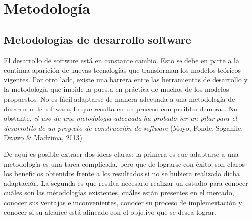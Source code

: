 \section{Metodología}
\subsection{Metodologías de desarrollo software}
El desarrollo de software está en constante cambio. 
Esto se debe en parte a la continua aparición de nuevas tecnologías que 
transforman los modelos teóricos vigentes. Por otro lado, existe una 
barrera entre las herramientas de desarrollo y la metodología que impide 
la puesta en práctica de muchos de los modelos propuestos. No es fácil 
adaptarse de manera adecuada a una metodología de desarrollo de software, 
lo que resulta en un proceso con posibles demoras. No obstante, \textit{el uso de una metodología adecuada ha probado ser un pilar para 
el desarrolllo de un proyecto de construcción de software} (Moyo, Fonde, Soganile, Dzawo \& Madzima, 2013). \medskip



De aquí es posible extraer dos ideas claras: la primera es que adaptarse a una metodología es una tarea complicada, 
pero que de lograrse con éxito, son claros los beneficios obtenidos frente a los resultados si no se hubiera 
realizado dicha adaptación. La segunda es que resulta necesario realizar un estudio para conocer 
cuáles son las métodologías existentes, cuáles están presentes en el mercado, conocer sus ventajas e inconvenientes, 
conocer su proceso de implementación y conocer si su alcance está alineado con el objetivo que se desea lograr. \medskip

